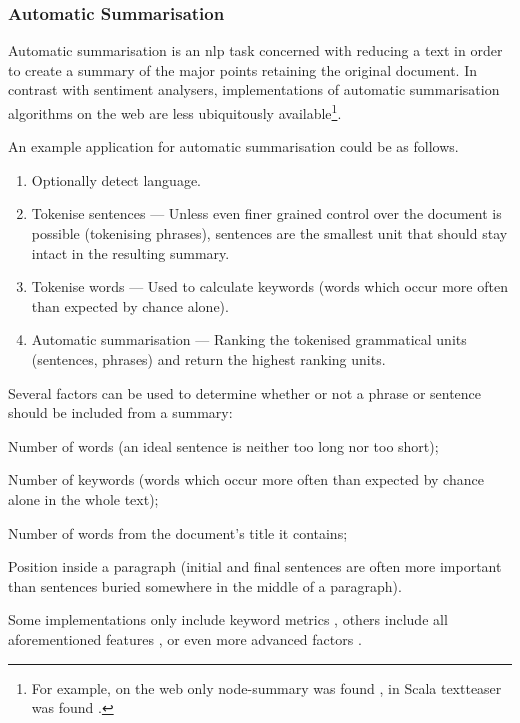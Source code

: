 \begin{enumerate}
\subsubsection{Automatic Summarisation}\label{automatic-summarisation}

Automatic summarisation is an \gls{nlp} task concerned with reducing a
text in order to create a summary of the major points retaining the
original document. In contrast with sentiment analysers, implementations
of automatic summarisation algorithms on the web are less ubiquitously
available\footnote{For example, on the web only node-summary was found
  \autocite{jbrooksuk/node-summary-source-code}, in Scala textteaser was found
  \autocite{MojoJolo/textteaser-source-code}.}.

An example application for automatic summarisation could be as follows.

\begin{enumerate}
\item
  Optionally detect language.
\item
  Tokenise sentences --- Unless even finer grained control over the
  document is possible (tokenising phrases), sentences are the smallest
  unit that should stay intact in the resulting summary.
\item
  Tokenise words --- Used to calculate keywords (words which occur more
  often than expected by chance alone).
\item
  Automatic summarisation --- Ranking the tokenised grammatical units
  (sentences, phrases) and return the highest ranking units.
\end{enumerate}

Several factors can be used to determine whether or not a phrase or
sentence should be included from a summary:

\begin{aenumerate}
\item
  Number of words (an ideal sentence is neither too long nor too short);
\item
  Number of keywords (words which occur more often than expected by
  chance alone in the whole text);
\item
  Number of words from the document's title it contains;
\item
  Position inside a paragraph (initial and final sentences are often
  more important than sentences buried somewhere in the middle of a
  paragraph).
\end{aenumerate}

Some implementations only include keyword metrics
\autocite{jbrooksuk/node-summary-source-code}, others include all
aforementioned features \autocite{MojoJolo/textteaser-source-code}, or
even more advanced factors \autocite{summly}.


\end{enumerate}
